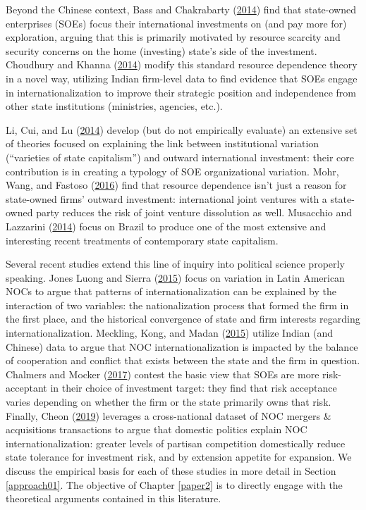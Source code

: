 \documentclass[11pt,]{book}
\begin{document}
Beyond the Chinese context, Bass and Chakrabarty (\protect\hyperlink{ref-bass_resource_2014}{2014}) find that state-owned enterprises (SOEs) focus their international investments on (and pay more for) exploration, arguing that this is primarily motivated by resource scarcity and security concerns on the home (investing) state's side of the investment. Choudhury and Khanna (\protect\hyperlink{ref-choudhury_toward_2014}{2014}) modify this standard resource dependence theory in a novel way, utilizing Indian firm-level data to find evidence that SOEs engage in internationalization to improve their strategic position and independence from other state institutions (ministries, agencies, etc.).

Li, Cui, and Lu (\protect\hyperlink{ref-li_varieties_2014}{2014}) develop (but do not empirically evaluate) an extensive set of theories focused on explaining the link between institutional variation (``varieties of state capitalism'') and outward international investment: their core contribution is in creating a typology of SOE organizational variation. Mohr, Wang, and Fastoso (\protect\hyperlink{ref-mohr_contingent_2016}{2016}) find that resource dependence isn't just a reason for state-owned firms' outward investment: international joint ventures with a state-owned party reduces the risk of joint venture dissolution as well. Musacchio and Lazzarini (\protect\hyperlink{ref-musacchio_reinventing_2014}{2014}) focus on Brazil to produce one of the most extensive and interesting recent treatments of contemporary state capitalism.

Several recent studies extend this line of inquiry into political science properly speaking. Jones Luong and Sierra (\protect\hyperlink{ref-jones_luong_domestic_2015}{2015}) focus on variation in Latin American NOCs to argue that patterns of internationalization can be explained by the interaction of two variables: the nationalization process that formed the firm in the first place, and the historical convergence of state and firm interests regarding internationalization. Meckling, Kong, and Madan (\protect\hyperlink{ref-meckling_oil_2015}{2015}) utilize Indian (and Chinese) data to argue that NOC internationalization is impacted by the balance of cooperation and conflict that exists between the state and the firm in question. Chalmers and Mocker (\protect\hyperlink{ref-chalmers_end_2017}{2017}) contest the basic view that SOEs are more risk-acceptant in their choice of investment target: they find that risk acceptance varies depending on whether the firm or the state primarily owns that risk. Finally, Cheon (\protect\hyperlink{ref-cheon_developing_2019}{2019}) leverages a cross-national dataset of NOC mergers \& acquisitions transactions to argue that domestic politics explain NOC internationalization: greater levels of partisan competition domestically reduce state tolerance for investment risk, and by extension appetite for expansion. We discuss the empirical basis for each of these studies in more detail in Section \ref{approach01}. The objective of Chapter \ref{paper2} is to directly engage with the theoretical arguments contained in this literature.
\end{document}
